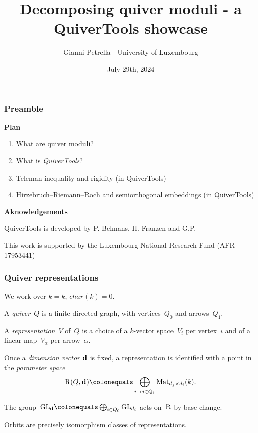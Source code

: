 \documentclass{beamer}
\title{Decomposing quiver moduli - a QuiverTools showcase}
\author{Gianni Petrella - University of Luxembourg}
\institute{MEGA 2024 - MPI MIS Leipzig}
\date{July 29th, 2024}
\begin{document}
\begin{frame}
    \titlepage
{}
\end{frame}

\begin{frame}
    \frametitle{Preamble}
\textbf{Plan}
\begin{enumerate}
    \item What are quiver moduli?
    \item What is \emph{QuiverTools}?
    \item Teleman inequality and rigidity (in QuiverTools)
    \item Hirzebruch--Riemann--Roch and semiorthogonal embeddings (in QuiverTools)
\end{enumerate} \pause
\vfill
\textbf{Aknowledgements}

QuiverTools is developed by P. Belmans, H. Franzen and G.P.

This work is supported by the Luxembourg National Research Fund (AFR-17953441)

\end{frame}

\begin{frame}
    \frametitle{Quiver representations}
\begin{definition}
    We work over $k = \bar{k}$, $char(k) = 0$. \pause

    A \emph{quiver}~$Q$ is a finite directed graph, with
    vertices~$Q_0$ and arrows~$Q_1$.

    A \emph{representation}~$V$ of~$Q$ is
    a choice of a $k$-vector space~$V_i$ per vertex~$i$
    and of a linear map~$V_{\alpha}$ per arrow~$\alpha$.
\end{definition} \pause

Once a \emph{dimension vector} $\mathbf{d}$ is fixed, a representation
is identified with a point in the \emph{parameter space}
\[
    \parameterspace(Q, \tuple{d})
    \colonequals \bigoplus_{i \to j \in Q_1}
    \Mat_{d_j \times d_i}(k).
\] \pause

The group~${\GL}_{\tuple{d}} \colonequals \bigoplus_{i \in Q_0} \GL_{d_i}$
acts on~$\operatorname{R}$ by base change. \pause

Orbits are precisely isomorphism classes of representations.
\end{frame}
\end{document}
